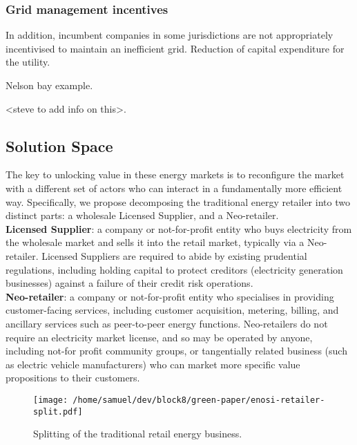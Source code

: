 \documentclass{article}
\theoremstyle{definition}
\theoremstyle{plain} %
\begin{document}
\subsubsection{Grid management incentives}

In addition, incumbent companies in some jurisdictions are not appropriately incentivised to maintain an inefficient grid. Reduction of capital expenditure for the utility.

Nelson bay example.

<steve to add info on this>.

\subsection{Solution Space}

The key to unlocking value in these energy markets is to reconfigure the market with a different set of actors who can interact in a fundamentally more efficient way. Specifically, we propose decomposing the traditional energy retailer into two distinct parts: a wholesale Licensed Supplier, and a Neo-retailer.\\

\noindent \textbf{Licensed Supplier}: a company or not-for-profit entity who buys electricity from the wholesale market and sells it into the retail market, typically via a Neo-retailer. Licensed Suppliers are required to abide by existing prudential regulations, including holding capital to protect creditors (electricity generation businesses) against a failure of their credit risk operations.\\

\noindent \textbf{Neo-retailer}: a company or not-for-profit entity who specialises in providing customer-facing services, including customer acquisition, metering, billing, and ancillary services such as peer-to-peer energy functions. Neo-retailers do not require an electricity market license, and so may be operated by anyone, including not-for profit community groups, or tangentially related business (such as electric vehicle manufacturers) who can market more specific value propositions to their customers.\\

\begin{figure}
\begin{center}
\texttt{[image: /home/samuel/dev/block8/green-paper/enosi-retailer-split.pdf]}\\
\caption{Splitting of the traditional retail energy business.}
\end{center}
\end{figure}
\end{document}

